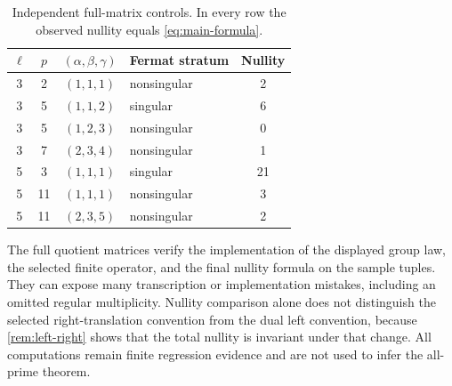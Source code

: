 \begin{table}[t]
\centering
\caption{Independent full-matrix controls.  In every row the observed
nullity equals \eqref{eq:main-formula}.}
\label{tab:controls}
\begin{tabular}{ccclc}
\toprule
$\ell$ & $p$ & $(\alpha,\beta,\gamma)$ & Fermat stratum & Nullity \\
\midrule
3 & 2  & $(1,1,1)$ & nonsingular & 2 \\
3 & 5  & $(1,1,2)$ & singular & 6 \\
3 & 5  & $(1,2,3)$ & nonsingular & 0 \\
3 & 7  & $(2,3,4)$ & nonsingular & 1 \\
5 & 3  & $(1,1,1)$ & singular & 21 \\
5 & 11 & $(1,1,1)$ & nonsingular & 3 \\
5 & 11 & $(2,3,5)$ & nonsingular & 2 \\
\bottomrule
\end{tabular}
\end{table}

The full quotient matrices verify the implementation of the displayed group
law, the selected finite operator, and the final nullity formula on the sample
tuples.  They can expose many transcription or implementation mistakes,
including an omitted regular multiplicity.  Nullity comparison alone does not
distinguish the selected right-translation convention from the dual left
convention, because \cref{rem:left-right} shows that the total nullity is
invariant under that change.  All computations remain finite regression
evidence and are not used to infer the all-prime theorem.
